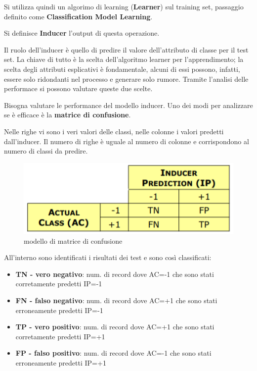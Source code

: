 Si utilizza quindi un algorimo di learning (\textbf{Learner}) sul training set, passaggio definito come \textbf{Classification Model Learning}. 

\begin{defn}
	Si definisce \textbf{Inducer} l'output di questa operazione.
\end{defn}

Il ruolo dell'inducer è quello di predire il valore dell'attributo di classe per il test set. 
La chiave di tutto è la scelta dell'algoritmo learner per l'apprendimento; la scelta degli attributi esplicativi è fondamentale, alcuni di essi possono, infatti, essere solo ridondanti nel processo e generare solo rumore. Tramite l'analisi delle performace si possono valutare queste due scelte. 

Bisogna valutare le performance del modello inducer. Uno dei modi per analizzare se è efficace è la \textbf{matrice di confusione}. 

Nelle righe vi sono i veri valori delle classi, nelle colonne i valori predetti dall'inducer. Il numero di righe è uguale al numero di colonne e corrispondono al numero di classi da predire.

\begin{figure}[H]
	\centering
	\includegraphics[height=0.25 \linewidth]{classification/pict/matrconf.png}
	\caption{modello di matrice di confusione}
\end{figure}
All'interno sono identificati i risultati dei test e sono così classificati:
\begin{itemize}
	\item \textbf{TN - vero negativo}: num. di record dove AC=-1  che sono stati corretamente predetti IP=-1
	\item \textbf{FN - falso negativo}: num. di record dove AC=+1  che sono stati erroneamente predetti IP=-1
	\item \textbf{TP - vero positivo}: num. di record dove AC=+1  che sono stati corretamente predetti IP=+1
	\item \textbf{FP - falso positivo}: num. di record dove AC=-1  che sono stati erroneamente predetti IP=+1
\end{itemize}

